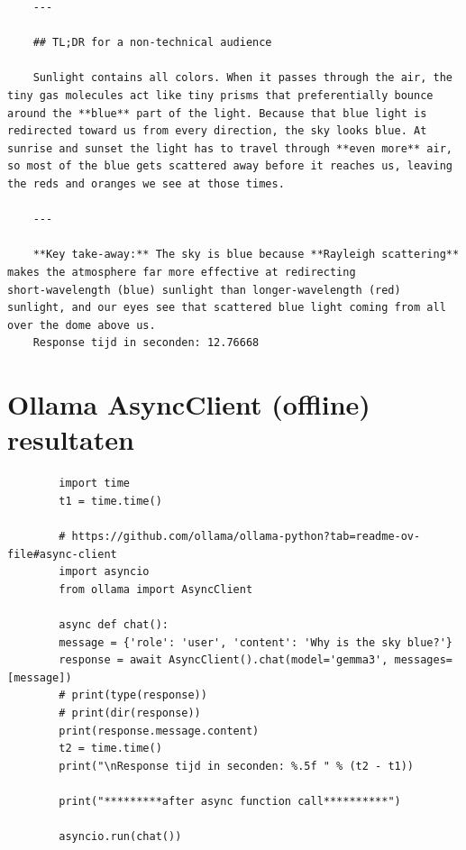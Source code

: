 \begin{verbatim}
    ---
    
    ## TL;DR for a non‑technical audience
    
    Sunlight contains all colors. When it passes through the air, the tiny gas molecules act like tiny prisms that preferentially bounce around the **blue** part of the light. Because that blue light is redirected toward us from every direction, the sky looks blue. At sunrise and sunset the light has to travel through **even more** air, so most of the blue gets scattered away before it reaches us, leaving the reds and oranges we see at those times.
    
    --- 
    
    **Key take‑away:** The sky is blue because **Rayleigh scattering** makes the atmosphere far more effective at redirecting short‑wavelength (blue) sunlight than longer‑wavelength (red) sunlight, and our eyes see that scattered blue light coming from all over the dome above us.
    Response tijd in seconden: 12.76668
\end{verbatim}

\section{Ollama AsyncClient (offline) resultaten}
\label{sec:ollamaasyncclientofflineresultaten}

\begin{listing}
    \begin{verbatim}
        import time
        t1 = time.time()
        
        # https://github.com/ollama/ollama-python?tab=readme-ov-file#async-client
        import asyncio
        from ollama import AsyncClient
        
        async def chat():
        message = {'role': 'user', 'content': 'Why is the sky blue?'}
        response = await AsyncClient().chat(model='gemma3', messages=[message])
        # print(type(response))
        # print(dir(response))
        print(response.message.content)
        t2 = time.time()
        print("\nResponse tijd in seconden: %.5f " % (t2 - t1))
        
        print("*********after async function call**********")
        
        asyncio.run(chat())
    \end{verbatim}
    \caption[Ollama AsyncClient Code]{Code om te communiceren met \textit{gemma3:4b}.}
    \label{lst:ollama-asyncclient-test}
\end{listing}

